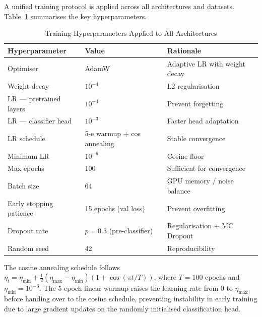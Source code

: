 A unified training protocol is applied across all architectures and datasets. Table~\ref{tab:training_config} summarises the key hyperparameters.

\begin{table}[h]
\footnotesize
\centering
\caption{Training Hyperparameters Applied to All Architectures}
\label{tab:training_config}
\begin{tabular}{lll}
\toprule
\textbf{Hyperparameter} & \textbf{Value} & \textbf{Rationale} \\
\midrule
Optimiser               & AdamW                                   & Adaptive LR with weight decay \\
Weight decay            & $10^{-4}$                               & L2 regularisation \\
LR — pretrained layers  & $10^{-4}$                               & Prevent forgetting \\
LR — classifier head    & $10^{-3}$                               & Faster head adaptation \\
LR schedule             & 5-e warmup + cos annealing              & Stable convergence \\
Minimum LR              & $10^{-6}$                               & Cosine floor \\
Max epochs              & 100                                     & Sufficient for convergence \\
Batch size              & 64                                      & GPU memory / noise balance \\
Early stopping patience & 15 epochs (val loss)                    & Prevent overfitting \\
Dropout rate            & $p = 0.3$ (pre-classifier)              & Regularisation + MC Dropout \\
Random seed             & 42                                      & Reproducibility \\
\bottomrule
\end{tabular}
\end{table}

The cosine annealing schedule follows $\eta_t = \eta_{\min} + \frac{1}{2}(\eta_{\max} - \eta_{\min})(1 + \cos(\pi t / T))$, where $T = 100$ epochs and $\eta_{\min} = 10^{-6}$. The 5-epoch linear warmup raises the learning rate from 0 to $\eta_{\max}$ before handing over to the cosine schedule, preventing instability in early training due to large gradient updates on the randomly initialised classification head.

